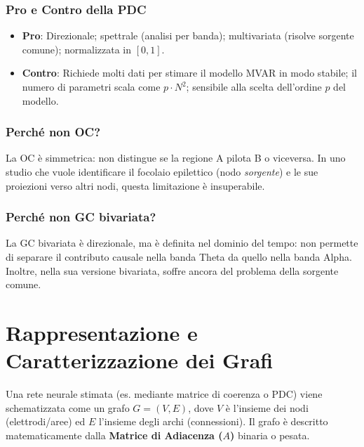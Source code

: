 \documentclass[10pt, letterpaper]{report}
\begin{document}
\subsubsection*{Pro e Contro della PDC}
\begin{itemize}
    \item[$+$] \textbf{Pro}: Direzionale; spettrale (analisi per banda); multivariata (risolve sorgente comune); normalizzata in $[0,1]$.
    \item[$-$] \textbf{Contro}: Richiede molti dati per stimare il modello MVAR in modo stabile; il numero di parametri scala come $p \cdot N^2$; sensibile alla scelta dell'ordine $p$ del modello.
\end{itemize}

\subsubsection*{Perché non OC?}
La OC è simmetrica: non distingue se la regione A pilota B o viceversa.
In uno studio che vuole identificare il focolaio epilettico (nodo \emph{sorgente}) e le sue proiezioni verso altri nodi, questa limitazione è insuperabile.

\subsubsection*{Perché non GC bivariata?}
La GC bivariata è direzionale, ma è definita nel dominio del tempo: non permette di separare il contributo causale nella banda Theta da quello nella banda Alpha.
Inoltre, nella sua versione bivariata, soffre ancora del problema della sorgente comune.



\section{Rappresentazione e Caratterizzazione dei Grafi}
Una rete neurale stimata (es. mediante matrice di coerenza o PDC) viene schematizzata come un grafo $G = (V, E)$, dove $V$ è l'insieme dei nodi (elettrodi/aree) ed $E$ l'insieme degli archi (connessioni).
Il grafo è descritto matematicamente dalla \textbf{Matrice di Adiacenza ($A$)} binaria o pesata.
\end{document}
